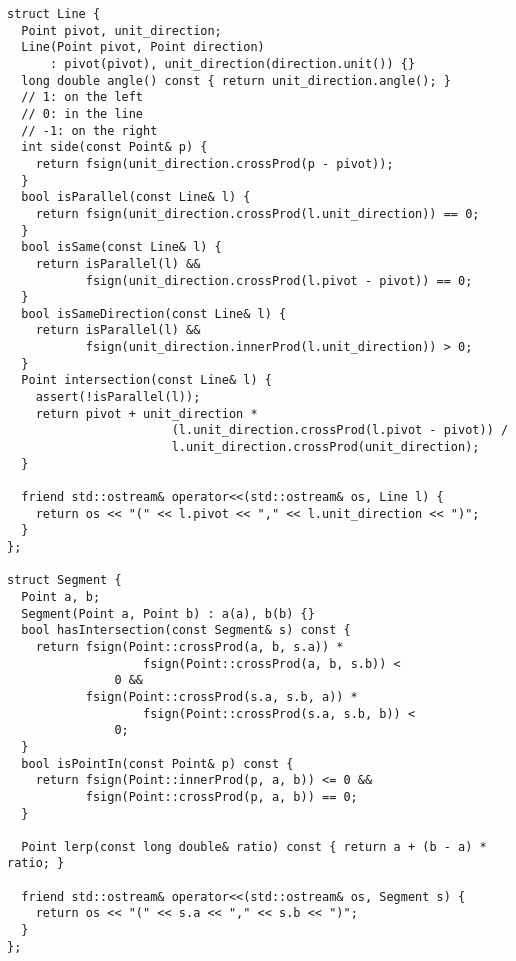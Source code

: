 \documentclass[6pt]{article}
\begin{document}
\begin{multicols}{2}
\begin{lstlisting}
struct Line {
  Point pivot, unit_direction;
  Line(Point pivot, Point direction)
      : pivot(pivot), unit_direction(direction.unit()) {}
  long double angle() const { return unit_direction.angle(); }
  // 1: on the left
  // 0: in the line
  // -1: on the right
  int side(const Point& p) {
    return fsign(unit_direction.crossProd(p - pivot));
  }
  bool isParallel(const Line& l) {
    return fsign(unit_direction.crossProd(l.unit_direction)) == 0;
  }
  bool isSame(const Line& l) {
    return isParallel(l) &&
           fsign(unit_direction.crossProd(l.pivot - pivot)) == 0;
  }
  bool isSameDirection(const Line& l) {
    return isParallel(l) &&
           fsign(unit_direction.innerProd(l.unit_direction)) > 0;
  }
  Point intersection(const Line& l) {
    assert(!isParallel(l));
    return pivot + unit_direction *
                       (l.unit_direction.crossProd(l.pivot - pivot)) /
                       l.unit_direction.crossProd(unit_direction);
  }

  friend std::ostream& operator<<(std::ostream& os, Line l) {
    return os << "(" << l.pivot << "," << l.unit_direction << ")";
  }
};

struct Segment {
  Point a, b;
  Segment(Point a, Point b) : a(a), b(b) {}
  bool hasIntersection(const Segment& s) const {
    return fsign(Point::crossProd(a, b, s.a)) *
                   fsign(Point::crossProd(a, b, s.b)) <
               0 &&
           fsign(Point::crossProd(s.a, s.b, a)) *
                   fsign(Point::crossProd(s.a, s.b, b)) <
               0;
  }
  bool isPointIn(const Point& p) const {
    return fsign(Point::innerProd(p, a, b)) <= 0 &&
           fsign(Point::crossProd(p, a, b)) == 0;
  }

  Point lerp(const long double& ratio) const { return a + (b - a) * ratio; }

  friend std::ostream& operator<<(std::ostream& os, Segment s) {
    return os << "(" << s.a << "," << s.b << ")";
  }
};


\end{lstlisting}
\end{multicols}
\end{document}
